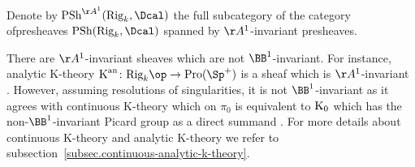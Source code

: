 \documentclass[colorinlistoftodos,article,11pt,reqno]{article}
\newcommand{\Rig}{\textup{Rig}}
\newcommand{\Pro}{\textup{Pro}}
\newcommand{\PSh}{\textup{PSh}}
\newcommand{\K}{\textup{K}}
\newcommand{\Kan}{\K^\textup{an}}
\newcommand{\Arig}{\AA^{1}}
\newcommand{\Brig}{\BB^{1}}
\renewcommand{\to}[1][]{\overset{#1}{\rightarrow}}
\begin{document}
\begin{defi}
Denote by $\PSh^{\Arig}(\Rig_k,\Dcal)$ the full subcategory of the category of\linebreak presheaves $\PSh(\Rig_k,\Dcal)$ spanned by $\Arig$-invariant presheaves.
\end{defi}

\begin{remark} \label{Kan-not-B1-invariant--remark}
There are $\Arig$-invariant sheaves which are not $\Brig$-invariant. For instance, analytic K-theory $\Kan \colon \Rig_k\op \to \Pro(\Sp^+)$ is a sheaf \cite[6.15]{kst-i} \cite[4.3]{kst-ii} which is $\Arig$-invariant \cite[4.4]{kst-ii}. However, assuming resolutions of singularities, it is not $\Brig$-invariant as it agrees with continuous K-theory \cite[6.19]{kst-i} which on $\pi_0$ is equivalent to $\K_0$ \cite[5.10]{kst-i} which has the non-$\Brig$-invariant Picard group as a direct summand \cite[Example~2]{kst-bass-quillen}. For more details about continuous K-theory and analytic K-theory we refer to subsection~\ref{subsec.continuous-analytic-k-theory}.
\end{remark}
\end{document}
